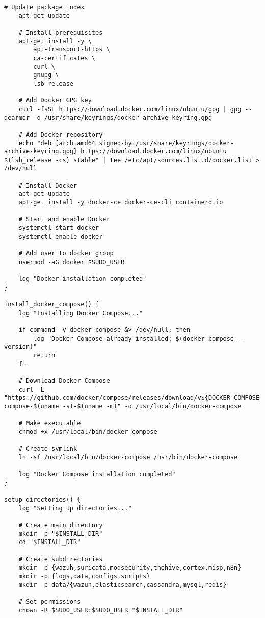 \begin{lstlisting}[style=bashstyle,caption=Script d'installation complete de la stack SOAR]
    # Update package index
    apt-get update
    
    # Install prerequisites
    apt-get install -y \
        apt-transport-https \
        ca-certificates \
        curl \
        gnupg \
        lsb-release
    
    # Add Docker GPG key
    curl -fsSL https://download.docker.com/linux/ubuntu/gpg | gpg --dearmor -o /usr/share/keyrings/docker-archive-keyring.gpg
    
    # Add Docker repository
    echo "deb [arch=amd64 signed-by=/usr/share/keyrings/docker-archive-keyring.gpg] https://download.docker.com/linux/ubuntu $(lsb_release -cs) stable" | tee /etc/apt/sources.list.d/docker.list > /dev/null
    
    # Install Docker
    apt-get update
    apt-get install -y docker-ce docker-ce-cli containerd.io
    
    # Start and enable Docker
    systemctl start docker
    systemctl enable docker
    
    # Add user to docker group
    usermod -aG docker $SUDO_USER
    
    log "Docker installation completed"
}

install_docker_compose() {
    log "Installing Docker Compose..."
    
    if command -v docker-compose &> /dev/null; then
        log "Docker Compose already installed: $(docker-compose --version)"
        return
    fi
    
    # Download Docker Compose
    curl -L "https://github.com/docker/compose/releases/download/v${DOCKER_COMPOSE_VERSION}/docker-compose-$(uname -s)-$(uname -m)" -o /usr/local/bin/docker-compose
    
    # Make executable
    chmod +x /usr/local/bin/docker-compose
    
    # Create symlink
    ln -sf /usr/local/bin/docker-compose /usr/bin/docker-compose
    
    log "Docker Compose installation completed"
}

setup_directories() {
    log "Setting up directories..."
    
    # Create main directory
    mkdir -p "$INSTALL_DIR"
    cd "$INSTALL_DIR"
    
    # Create subdirectories
    mkdir -p {wazuh,suricata,modsecurity,thehive,cortex,misp,n8n}
    mkdir -p {logs,data,configs,scripts}
    mkdir -p data/{wazuh,elasticsearch,cassandra,mysql,redis}
    
    # Set permissions
    chown -R $SUDO_USER:$SUDO_USER "$INSTALL_DIR"
    

\end{lstlisting}
